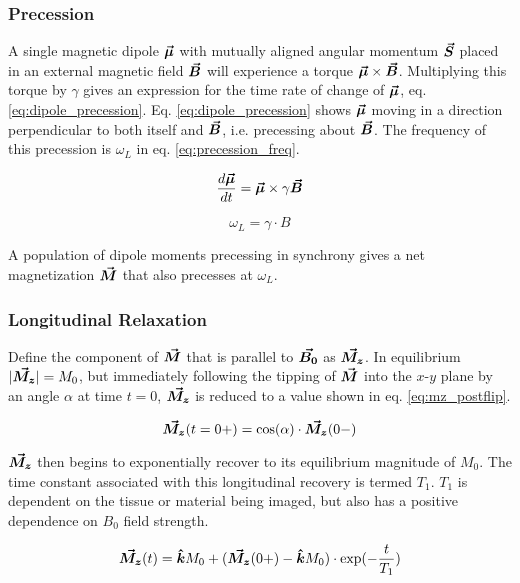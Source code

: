 \subsubsection{Precession}
A single magnetic dipole $\bm{\vec{\mu}}$ with mutually aligned angular momentum $\bm{\vec{S}}$ placed in an external magnetic
field $\bm{\vec{B}}$ will experience a torque $\bm{\vec{\mu}} \times \bm{\vec{B}}$. Multiplying this torque by $\gamma$ gives an
expression for the time rate of change of $\bm{\vec{\mu}}$, eq. \ref{eq:dipole_precession}. Eq. \ref{eq:dipole_precession}
shows $\bm{\vec{\mu}}$ moving in a direction perpendicular to both itself and $\bm{\vec{B}}$, i.e. precessing about $\bm{\vec{B}}$.
The frequency of this precession is $\omega_L$ in eq. \ref{eq:precession_freq}.

\begin{equation}\label{eq:dipole_precession}
    \frac{d \bm{\vec{\mu}}}{dt} = \bm{\vec{\mu}} \times \gamma \bm{\vec{B}}
\end{equation}

\begin{equation}\label{eq:precession_freq}
    \omega_L = \gamma \cdot B
\end{equation}

A population of dipole moments precessing in synchrony gives a net magnetization $\bm{\vec{M}}$ that also precesses at
$\omega_L$.

\subsubsection{Longitudinal Relaxation}
Define the component of $\bm{\vec{M}}$ that is parallel to $\bm{\vec{B_0}}$ as $\bm{\vec{M_z}}$. In equilibrium $|\bm{\vec{M_z}}| =
M_0$, but immediately following the tipping of $\bm{\vec{M}}$ into the $x$-$y$ plane by an angle $\alpha$ at time $t=0$,
$\bm{\vec{M_z}}$ is reduced to a value shown in eq. \ref{eq:mz_postflip}.

\begin{equation}\label{eq:mz_postflip}
    \bm{\vec{M_z}}(t=0+) = \cos(\alpha) \cdot \bm{\vec{M_z}}(0-)
\end{equation}

$\bm{\vec{M_z}}$ then begins to exponentially recover to its equilibrium magnitude of $M_0$. The time constant associated
with this longitudinal recovery is termed $T_1$. $T_1$ is dependent on the tissue or material being imaged, but also has
a positive dependence on $B_0$ field strength.

\begin{equation}\label{eq:t1_decay}
    \bm{\vec{M_{z}}}(t) = \bm{\hat{k}} M_0 + (\bm{\vec{M_{z}}}(0+) - \bm{\hat{k}} M_0) \cdot \exp(-\frac{t}{T_1})
\end{equation}

